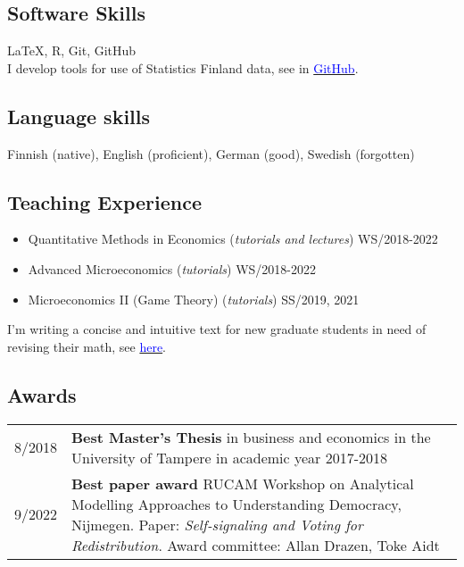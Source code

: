 \documentclass[16pt]{article}
\begin{document}
\subsection*{Software Skills}

\LaTeX, R, Git, GitHub \\

\noindent I develop tools for use of Statistics Finland data, see in \href{https://github.com/jalasalmi}{\textcolor{blue}{GitHub}}.

\subsection*{Language skills}
Finnish (native), English (proficient), German (good), Swedish (forgotten)

\subsection*{Teaching Experience}
\begin{itemize} \setlength\itemsep{0.01em}
                          \item Quantitative Methods in Economics (\textit{tutorials and lectures}) WS/2018-2022  
                          \item Advanced Microeconomics (\textit{tutorials}) WS/2018-2022 
                          \item Microeconomics II (Game Theory) (\textit{tutorials}) SS/2019, 2021 
\end{itemize}

\noindent I'm writing a concise and intuitive text for new graduate students in need of revising their math, see \href{https://cloud.uni-konstanz.de/index.php/s/nSm3TmENpPX3q6C}{\textcolor{blue}{here}}.



\subsection*{Awards} 
\begin{tabular}{@{}p{1.5in}p{5in}}
8/2018           & \textbf{Best Master's Thesis} in business and economics in the University of Tampere in academic year 2017-2018 \\
9/2022           & \textbf{Best paper award} RUCAM Workshop on Analytical Modelling Approaches to Understanding Democracy, Nijmegen. Paper: \textit{Self-signaling and Voting for Redistribution}. Award committee: Allan Drazen, Toke Aidt
\end{tabular}
\end{document}
